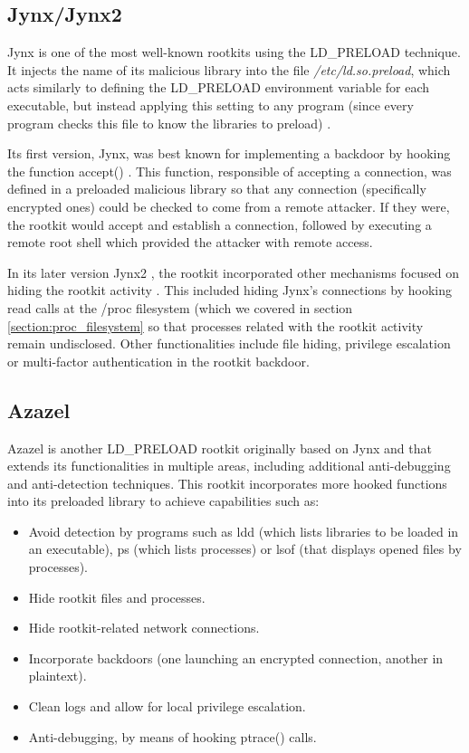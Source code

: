 \subsection{Jynx/Jynx2}
Jynx \cite{jynx_github} is one of the most well-known rootkits using the LD\_PRELOAD technique. It injects the name of its malicious library into the file \textit{/etc/ld.so.preload}, which acts similarly to defining the LD\_PRELOAD environment variable for each executable, but instead applying this setting to any program (since every program checks this file to know the libraries to preload) \cite{ldpreload_so_jynx}.

Its first version, Jynx, was best known for implementing a backdoor by hooking the function accept() \cite{ldpreload_pros_2327}. This function, responsible of accepting a connection, was defined in a preloaded malicious library so that any connection (specifically encrypted ones) could be checked to come from a remote attacker. If they were, the rootkit would accept and establish a connection, followed by executing a remote root shell which provided the attacker with remote access.

In its later version Jynx2 \cite{jynx2_github}, the rootkit incorporated other mechanisms focused on hiding the rootkit activity \cite{jynx2_infosecinstitute}. This included hiding Jynx's connections by hooking read calls at the /proc filesystem (which we covered in section \ref{section:proc_filesystem} so that processes related with the rootkit activity remain undisclosed. Other functionalities include file hiding, privilege escalation or multi-factor authentication in the rootkit backdoor.

\subsection{Azazel}
Azazel is another LD\_PRELOAD rootkit originally based on Jynx and that extends its functionalities in multiple areas, including additional anti-debugging and anti-detection techniques. This rootkit incorporates more hooked functions into its preloaded library to achieve capabilities such as:
\begin{itemize}
\item Avoid detection by programs such as ldd (which lists libraries to be loaded in an executable), ps (which lists processes) or lsof (that displays opened files by processes).
\item Hide rootkit files and processes.
\item Hide rootkit-related network connections.
\item Incorporate backdoors (one launching an encrypted connection, another in plaintext).
\item Clean logs and allow for local privilege escalation.
\item Anti-debugging, by means of hooking ptrace() calls.
\end{itemize}

